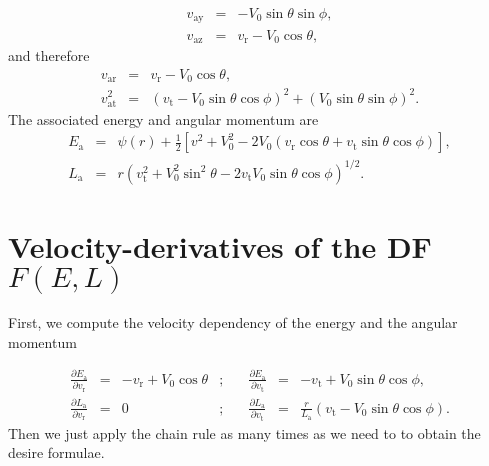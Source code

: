 \documentclass[11pt]{article}
\newcommand{\rt}{\mathrm{t}}
\newcommand{\rr}{\mathrm{r}}
\newcommand{\ry}{\mathrm{y}}
\newcommand{\rz}{\mathrm{z}}
\newcommand{\ra}{\mathrm{a}}
\newcommand{\vr}{v_{\rr}}
\newcommand{\vt}{v_{\rt}}
\newcommand{\vay}{v_{\ra \ry}}
\newcommand{\vaz}{v_{\ra \rz}}
\newcommand{\var}{v_{\ra \rr}}
\newcommand{\vat}{v_{\ra \rt}}
\newcommand{\Ea}{E_{\ra}}
\newcommand{\La}{L_{\ra}}
\begin{document}
\begin{appendices}
\begin{equation}
\begin{array}{ccl}
  \vay &=& \displaystyle{-V_{0}\sin\theta\sin\phi} , \\

  \vaz & =& \displaystyle{\vr - V_{0}\cos\theta} ,
\end{array}
\label{eq:va_coord}
\end{equation}
and therefore
\begin{equation}
  \begin{array}{ccl}
  \var & =&\displaystyle{\vr-V_{0}\cos\theta} ,\\

  \vat^{2} & =& \displaystyle{(\vt-V_{0}\sin\theta\cos\phi)^{2}+(V_{0}\sin\theta\sin\phi)^{2}} .
  \end{array}
  \label{eq:va_r_t}
\end{equation}
The associated energy and angular momentum are
\begin{equation}
  \begin{array}{ccl}
  \Ea & =&\displaystyle{\psi(r)+\frac{1}{2}\left[v^{2}+V_{0}^{2}-2V_{0}\left(\vr\cos\theta + \vt\sin\theta\cos\phi\right)\right]} ,\\

  \La & =& \displaystyle{r\left(\vt^{2}+V_{0}^{2}\sin^{2}\theta-2\vt V_{0}\sin\theta\cos\phi\right)^{1/2}} .
  \end{array}
  \label{eq:Ea_La}
\end{equation}

\section{Velocity-derivatives of the DF $F(E,L)$}
\label{app:fq_derivatives}

First, we compute the velocity dependency of the energy and the angular momentum

\begin{equation}
  \begin{array}{cclcccl}
  \displaystyle{\frac{\partial\Ea}{\partial \vr}} & =&\displaystyle{-\vr + V_{0} \cos\theta}&;\quad&  \displaystyle{\frac{\partial\Ea}{\partial \vt}} & =&\displaystyle{-\vt + V_{0}\sin\theta \cos\phi},\\

  \displaystyle{\frac{\partial\La}{\partial \vr}} & =&\displaystyle{
    0}&;\quad&  \displaystyle{\frac{\partial\La}{\partial \vt}} & =&\displaystyle{\frac{r}{\La} (\vt-V_{0}\sin\theta\cos\phi)} .
 
  \end{array}
  \label{eq:Ea_La}
\end{equation}
Then we just apply the chain rule as many times as we need to to obtain the desire formulae.


\end{appendices}
\end{document}

